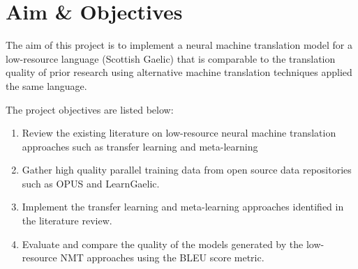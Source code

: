 \section{Aim \& Objectives}
The aim of this project is to implement a neural machine translation model for a low-resource language (Scottish Gaelic) that is comparable to the translation quality of prior research using alternative machine translation techniques applied the same language.

The project objectives are listed below:

\begin{enumerate}
  \item Review the existing literature on low-resource neural machine translation approaches such as transfer learning and meta-learning

  \item Gather high quality parallel training data from open source data repositories such as OPUS and LearnGaelic.
  \item Implement the transfer learning and meta-learning approaches identified in the literature review.
  \item Evaluate and compare the quality of the models generated by the low-resource \acrshort{NMT} approaches using the \acrshort{BLEU} score metric.
\end{enumerate}


